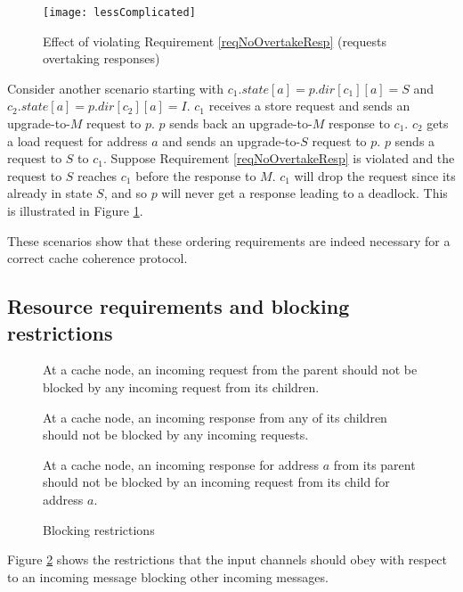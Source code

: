 \begin{figure}
\centering
\texttt{[image: lessComplicated]}
\caption{Effect of violating Requirement \ref{reqNoOvertakeResp} (requests overtaking responses)}
\label{lessComplicated}
\end{figure}

Consider another scenario starting with $c_1.state[a] = p.dir[c_1][a] = S$ and
$c_2.state[a] = p.dir[c_2][a] = I$. $c_1$ receives a store request and sends an
upgrade-to-$M$ request to $p$. $p$ sends back an upgrade-to-$M$ response to
$c_1$. $c_2$ gets a load request for address $a$ and sends an upgrade-to-$S$
request to $p$. $p$ sends a request to $S$ to $c_1$. Suppose Requirement
\ref{reqNoOvertakeResp} is violated and the request to $S$ reaches $c_1$ before
the response to $M$. $c_1$ will drop the request since its already in state $S$,
and so $p$ will never get a response leading to a deadlock. This is illustrated
in Figure \ref{lessComplicated}.

These scenarios show that these ordering requirements are indeed necessary for a
correct cache coherence protocol.

\subsection{Resource requirements and blocking restrictions}

\begin{figure}\small
\begin{requirement}
At a cache node, an incoming request from the parent should not be blocked by any
incoming request from its children.\label{cReqNoBlockPReq}
\end{requirement}
\begin{requirement}
At a cache node, an incoming response from any of its children should not
be blocked by any incoming requests.\label{reqNoBlockResp}
\end{requirement}
\begin{requirement}
At a cache node, an incoming response for address $a$ from its parent should not be blocked by
an incoming request from its child for address $a$. \label{reqBlockResp2}
\end{requirement}
\caption{Blocking restrictions}
\label{blocking}
\end{figure}

Figure \ref{blocking} shows the restrictions that the input channels should
obey with respect to an incoming message blocking other incoming messages.

